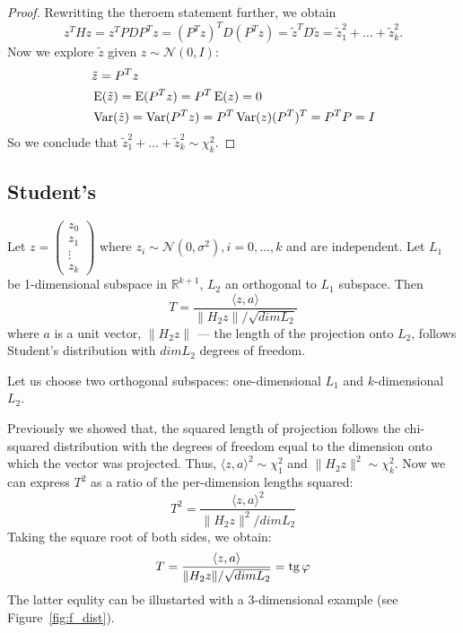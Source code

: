 \begin{proof}
Rewritting the theroem statement further, we obtain
\[
z^T H z = z^T P D P^T z = (P^T z)^T D (P^T z) = \tilde z^T D \tilde z = \tilde z_1^2 + \ldots + \tilde z_k^2.
\]
Now we explore $\tilde z$ given $z \sim \mathcal{N}(0, I)$:
\begin{align*}
&\tilde z = P^T z \\
&\operatorname{E}(\tilde z) = \operatorname{E}(P^T z) = P^T \operatorname{E}(z) = 0 \\
&\operatorname{Var}(\tilde z) = \operatorname{Var}(P^T z) = P^T \operatorname{Var}(z) (P^T)^T = P^T P = I
\end{align*}
So we conclude that $\tilde z_1^2 + \ldots + \tilde z_k^2 \sim \chi^2_k$.

\end{proof}


\subsection{Student's}


\begin{definition}
Let  $z = \begin{pmatrix} z_0 \\ z_1 \\ \vdots \\ z_k \end{pmatrix}$
where $z_i \sim \mathcal{N}(0, \sigma^2), i=0, \ldots, k$ and are independent.
Let $L_1$ be 1-dimensional subspace in $\mathbb{R}^{k+1}$, $L_2$ an orthogonal to $L_1$ subspace.
Then
\[
T = \frac{\langle z, a \rangle}{\lVert H_2 z \rVert / \sqrt{dim L_2}}
\]
where $a$ is a unit vector,
$\lVert H_2 z \rVert$ — the length of the projection onto $L_2$,
follows Student's distribution with $dim L_2$ degrees of freedom.
\end{definition}

Let us choose two orthogonal subspaces: one-dimensional $L_1$ and
$k$-dimensional $L_2$.

Previously we showed that, the squared length of projection follows
the chi-squared distribution with the degrees of freedom equal to the dimension
onto which the vector was projected. Thus, $\langle z, a \rangle^2 \sim \chi^2_1$
and $\lVert H_2 z \rVert^2 \sim \chi^2_{k}$.
Now we can express $T^2$ as a ratio of the per-dimension lengths squared:
\[
T^2 = \frac{\langle z, a \rangle^2}{\lVert H_2 z \rVert^2 / dim L_2}
\]
Taking the square root of both sides, we obtain:
\[
T = \frac{\langle z, a \rangle}{\lVert H_2 z \rVert / \sqrt{dim L_2}} = \operatorname{tg} \varphi
\]
The latter equlity can be illustarted with a $3$-dimensional example (see Figure~\ref{fig:f_dist}).





